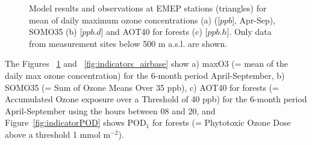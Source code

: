 \begin{figure}[H]
  \centering
\caption{Model results and observations at EMEP stations (triangles) for mean of daily maximum ozone concentrations (a) ([$ppb$], Apr-Sep), SOMO35 (b) [$ppb.d$] and AOT40 for forests (c) [$ppb.h$]. Only data from measurement sites below 500 m a.s.l. are shown.}
\label{fig:indicators_emep}
\end{figure}

The Figures ~\ref{fig:indicators_emep} and ~\ref{fig:indicators_airbase} show a) maxO3 (= mean of the daily max ozone concentration) for the 6-month period April-September, b) SOMO35 (= Sum of Ozone Means Over 35 ppb), c) AOT40 for forests (= Accumulated Ozone exposure over a Threshold of 40 ppb) for the 6-month period April-September using the hours between 08 and 20, and Figure~\ref{fig:indicatorPOD} shows POD$_1$ for forests (= Phytotoxic Ozone Dose above a threshold 1 mmol m$^{-2}$). 

